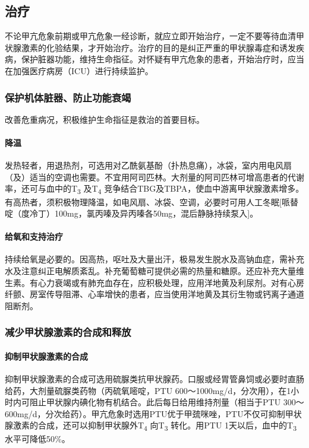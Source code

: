 \subsection{治疗}

不论甲亢危象前期或甲亢危象一经诊断，就应立即开始治疗，一定不要等待血清甲状腺激素的化验结果，才开始治疗。治疗的目的是纠正严重的甲状腺毒症和诱发疾病，保护脏器功能，维持生命指征。对怀疑有甲亢危象的患者，开始治疗时，应当在加强医疗病房（ICU）进行持续监护。

\subsubsection{保护机体脏器、防止功能衰竭}

改善危重病况，积极维护生命指征是救治的首要目标。

\paragraph{降温}

发热轻者，用退热剂，可选用对乙酰氨基酚（扑热息痛），冰袋，室内用电风扇（及）适当的空调也需要。不宜用阿司匹林。大剂量的阿司匹林可增高患者的代谢率，还可与血中的T\textsubscript{3}
及T\textsubscript{4}
竞争结合TBG及TBPA，使血中游离甲状腺激素增多。有高热者，须积极物理降温，如电风扇、冰袋、空调，必要时可用人工冬眠{[}哌替啶（度冷丁）100mg，氯丙嗪及异丙嗪各50mg，混后静脉持续泵入{]}。

\paragraph{给氧和支持治疗}

持续给氧是必要的。因高热，呕吐及大量出汗，极易发生脱水及高钠血症，需补充水及注意纠正电解质紊乱。补充葡萄糖可提供必需的热量和糖原。还应补充大量维生素。有心力衰竭或有肺充血存在，应积极处理，应用洋地黄及利尿剂。对有心房纤颤、房室传导阻滞、心率增快的患者，应当使用洋地黄及其衍生物或钙离子通道阻断剂。

\subsubsection{减少甲状腺激素的合成和释放}

\paragraph{抑制甲状腺激素的合成}

抑制甲状腺激素的合成可选用硫脲类抗甲状腺药。口服或经胃管鼻饲或必要时直肠给药，大剂量硫脲类药物（丙硫氧嘧啶，PTU
600～1000mg/d，分次用），在1小时内可阻止甲状腺内碘化物有机结合。此后每日给用维持剂量（相当于PTU
300～600mg/d，分次给药）。甲亢危象时选用PTU优于甲巯咪唑，PTU不仅可抑制甲状腺激素的合成，还可以抑制甲状腺外T\textsubscript{4}
向T\textsubscript{3} 转化。用PTU 1天以后，血中的T\textsubscript{3}
水平可降低50\%。

